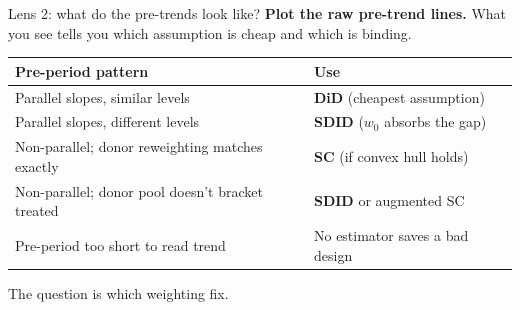 \documentclass[aspectratio=169,11pt]{beamer}
\begin{document}
\begin{frame}{Lens 2: what do the pre-trends look like?}
\footnotesize
\textbf{Plot the raw pre-trend lines.} \;What you see tells you which assumption is cheap and which is binding.

\vspace{0.4em}
\begin{center}
\renewcommand{\arraystretch}{1.25}
\begin{tabular}{p{} l}
\toprule
\textbf{Pre-period pattern} & \textbf{Use} \\
\midrule
Parallel slopes, similar levels & \textbf{DiD} (cheapest assumption) \\
Parallel slopes, different levels & \textbf{SDID} ($w_0$ absorbs the gap) \\
Non-parallel; donor reweighting matches exactly & \textbf{SC} (if convex hull holds) \\
Non-parallel; donor pool doesn't bracket treated & \textbf{SDID} or augmented SC \\
Pre-period too short to read trend & No estimator saves a bad design \\
\bottomrule
\end{tabular}
\end{center}

\vspace{0.5em}
 \;The question is which weighting fix.
\end{frame}
\end{document}
